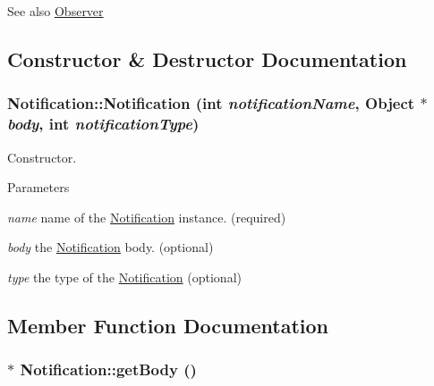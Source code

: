 \begin{DoxySeeAlso}{See also}
\hyperlink{class_pure_m_v_c_1_1_observer}{Observer} 
\end{DoxySeeAlso}


\subsection{Constructor \& Destructor Documentation}
\hypertarget{class_pure_m_v_c_1_1_notification_a6c2e3395ec9cc6f7b6f974ed15107067}{
\subsubsection[{Notification}]{\setlength{\rightskip}{0pt plus 5cm}Notification::Notification (int {\em notificationName}, \/  {\bf Object} $\ast$ {\em body}, \/  int {\em notificationType})}}
\label{class_pure_m_v_c_1_1_notification_a6c2e3395ec9cc6f7b6f974ed15107067}


Constructor. 
\begin{DoxyParams}{Parameters}
\item[{\em name}]name of the {\ttfamily \hyperlink{class_pure_m_v_c_1_1_notification}{Notification}} instance. (required) \item[{\em body}]the {\ttfamily \hyperlink{class_pure_m_v_c_1_1_notification}{Notification}} body. (optional) \item[{\em type}]the type of the {\ttfamily \hyperlink{class_pure_m_v_c_1_1_notification}{Notification}} (optional) \end{DoxyParams}


\subsection{Member Function Documentation}
\hypertarget{class_pure_m_v_c_1_1_notification_a57b45067ffdee2037305396e190f83b9}{
\subsubsection[{getBody}]{ $\ast$ Notification::getBody ()}}
\label{class_pure_m_v_c_1_1_notification_a57b45067ffdee2037305396e190f83b9}


